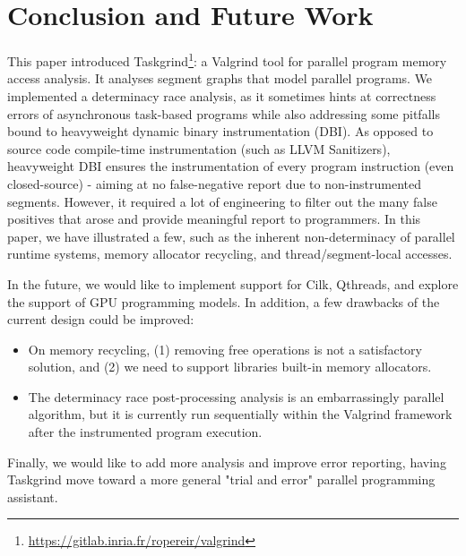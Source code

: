 \section{Conclusion and Future Work}    \label{sec:conclusion}


This paper introduced Taskgrind\footnote{\url{https://gitlab.inria.fr/ropereir/valgrind}}: a Valgrind tool for parallel program memory access analysis.
It analyses segment graphs that model parallel programs.
We implemented a determinacy race analysis, as it sometimes hints at correctness errors of asynchronous task-based programs while also addressing some pitfalls bound to heavyweight dynamic binary instrumentation (DBI).
As opposed to source code compile-time instrumentation (such as LLVM Sanitizers), heavyweight DBI ensures the instrumentation of every program instruction (even closed-source) - aiming at no false-negative report due to non-instrumented segments.
However, it required a lot of engineering to filter out the many false positives that arose and provide meaningful report to programmers.
In this paper, we have illustrated a few, such as the inherent non-determinacy of parallel runtime systems, memory allocator recycling, and thread/segment-local accesses.

In the future, we would like to implement support for Cilk, Qthreads, and explore the support of GPU programming models.
In addition, a few drawbacks of the current design could be improved:
\begin{itemize}
	\item 	On memory recycling, (1) removing free operations is not a satisfactory solution, and (2) we need to support libraries built-in memory allocators.
	\item 	The determinacy race post-processing analysis is an embarrassingly parallel algorithm, but it is currently run sequentially within the Valgrind framework after the instrumented program execution.
\end{itemize}
Finally, we would like to add more analysis and improve error reporting, having Taskgrind move toward a more general "trial and error" parallel programming assistant.

